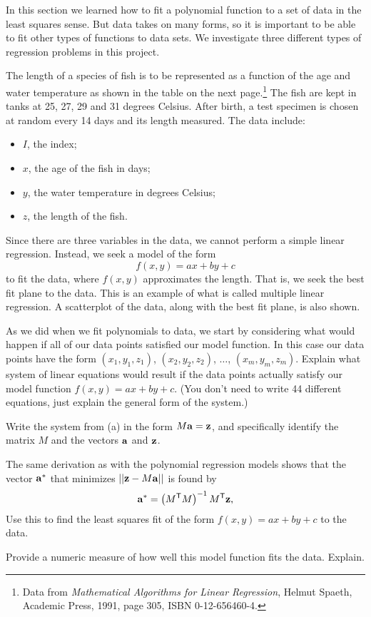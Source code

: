 In this section we learned how to fit a polynomial function to a set of data in the least squares sense. But data takes on many forms, so it is important to be able to fit other types of functions to data sets. We investigate three different types of regression problems in this project.

\begin{pactivity} The length of a species of fish is to be represented as a function of the age and water temperature as shown in the table on the next page.\footnote{Data from \emph{Mathematical Algorithms for Linear Regression}, Helmut Spaeth, Academic Press, 1991, page 305, ISBN 0-12-656460-4.}  The fish are kept in tanks at 25, 27, 29 and 31 degrees Celsius.  After birth, a test specimen is chosen at random every 14 days and its length measured. The data include:
\begin{itemize}
\item $I$,  the index;
\item $x$, the age of the fish in days;
\item $y$, the water temperature in degrees Celsius;
\item $z$,  the length of the fish.
\end{itemize}
Since there are three variables in the data, we cannot perform a simple linear regression. Instead, we seek a model of the form 
\[f(x,y) = ax+by+c\]
to fit the data, where $f(x,y)$ approximates the length. That is, we seek the best fit plane to the data. This is an example of what is called multiple linear regression. A scatterplot of the data, along with the best fit plane, is also shown. 

\ba
\item As we did when we fit polynomials to data, we start by considering what would happen if all of our data points satisfied our model function. In this case our data points have the form $(x_1,y_1,z_1)$, $(x_2,y_2,z_2)$, $\ldots$, $(x_m,y_m,z_m)$. Explain what system of linear equations would result if the data points actually satisfy our model function $f(x,y)= ax+by+c$. (You don't need to write 44 different equations, just explain the general form of the system.)

\item Write the system from (a) in the form $M \mathbf{a} = \mathbf{z}$, and specifically identify the matrix $M$ and the vectors $\mathbf{a}$ and $\mathbf{z}$.

\item The same derivation as with the polynomial regression models shows that the vector $\mathbf{a}^*$ that minimizes $||\mathbf{z} - M\mathbf{a}||$ is found by 
\[\mathbf{a}^* = \left(M^{\mathsf{T}}M\right)^{-1}M^{\mathsf{T}}\mathbf{z},\]
Use this to find the least squares fit of the form $f(x,y) = ax+by+c$ to the data. 

\item Provide a numeric measure of how well this model function fits the data. Explain.

\ea

\end{pactivity}

